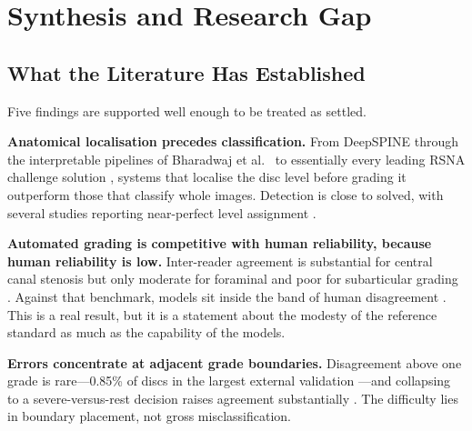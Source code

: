 \section{Synthesis and Research Gap}
\label{sec:lr-gap}

\subsection{What the Literature Has Established}
\label{sec:lr-established}

Five findings are supported well enough to be treated as settled.

\textbf{Anatomical localisation precedes classification.} From DeepSPINE
\cite{lu2018deepspine} through the interpretable pipelines of Bharadwaj et al.\
\cite{bharadwaj2023deep} to essentially every leading RSNA challenge solution
\cite{batra2025mscan}, systems that localise the disc level before grading it
outperform those that classify whole images. Detection is close to solved, with
several studies reporting near-perfect level assignment
\cite{pan2021automatically,ghosh2012a}.

\textbf{Automated grading is competitive with human reliability, because human
reliability is low.} Inter-reader agreement is substantial for central canal
stenosis but only moderate for foraminal and poor for subarticular grading
\cite{lurie2008reliability}. Against that benchmark, models sit inside the band
of human disagreement \cite{won2020spinal,mcsweeney2023external,tumko2024a}.
This is a real result, but it is a statement about the modesty of the reference
standard as much as the capability of the models.

\textbf{Errors concentrate at adjacent grade boundaries.} Disagreement above one
grade is rare---0.85\% of discs in the largest external validation
\cite{mcsweeney2023external}---and collapsing to a severe-versus-rest decision
raises agreement substantially \cite{ishimoto2020could}. The difficulty lies in
boundary placement, not gross misclassification.

